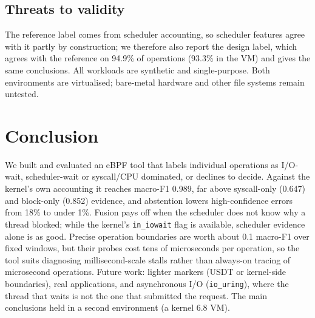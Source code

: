 \documentclass[conference]{IEEEtran}
\begin{document}
\subsection{Threats to validity}
The reference label comes from scheduler accounting, so scheduler features agree with it partly by construction; we therefore also report the design label, which agrees with the reference on 94.9\% of operations (93.3\% in the VM) and gives the same conclusions. All workloads are synthetic and single-purpose. Both environments are virtualised; bare-metal hardware and other file systems remain untested.

\section{Conclusion}
We built and evaluated an eBPF tool that labels individual operations as I/O-wait, scheduler-wait or syscall/CPU dominated, or declines to decide. Against the kernel's own accounting it reaches macro-F1 0.989, far above syscall-only (0.647) and block-only (0.852) evidence, and abstention lowers high-confidence errors from 18\% to under 1\%. Fusion pays off when the scheduler does not know why a thread blocked; while the kernel's \texttt{in\_iowait} flag is available, scheduler evidence alone is as good. Precise operation boundaries are worth about 0.1 macro-F1 over fixed windows, but their probes cost tens of microseconds per operation, so the tool suits diagnosing millisecond-scale stalls rather than always-on tracing of microsecond operations. Future work: lighter markers (USDT or kernel-side boundaries), real applications, and asynchronous I/O (\texttt{io\_uring}), where the thread that waits is not the one that submitted the request. The main conclusions held in a second environment (a kernel 6.8 VM).



\end{document}
